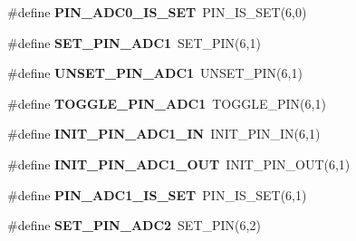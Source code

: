 \begin{DoxyCompactItemize}
\item 
\hypertarget{group__chaos__internal_ga36b481203cb07d9f3eaebc2716d992fb}{\#define {\bfseries P\-I\-N\-\_\-\-A\-D\-C0\-\_\-\-I\-S\-\_\-\-S\-E\-T}~P\-I\-N\-\_\-\-I\-S\-\_\-\-S\-E\-T(6,0)}\label{group__chaos__internal_ga36b481203cb07d9f3eaebc2716d992fb}

\item 
\hypertarget{group__chaos__internal_ga8fda716103a0ece8568194f7d2b8f1cf}{\#define {\bfseries S\-E\-T\-\_\-\-P\-I\-N\-\_\-\-A\-D\-C1}~S\-E\-T\-\_\-\-P\-I\-N(6,1)}\label{group__chaos__internal_ga8fda716103a0ece8568194f7d2b8f1cf}

\item 
\hypertarget{group__chaos__internal_gab163c7cb46720c474fb5062e4b1e7b1b}{\#define {\bfseries U\-N\-S\-E\-T\-\_\-\-P\-I\-N\-\_\-\-A\-D\-C1}~U\-N\-S\-E\-T\-\_\-\-P\-I\-N(6,1)}\label{group__chaos__internal_gab163c7cb46720c474fb5062e4b1e7b1b}

\item 
\hypertarget{group__chaos__internal_gadbc63ddea7b3b19198e7536c479081ef}{\#define {\bfseries T\-O\-G\-G\-L\-E\-\_\-\-P\-I\-N\-\_\-\-A\-D\-C1}~T\-O\-G\-G\-L\-E\-\_\-\-P\-I\-N(6,1)}\label{group__chaos__internal_gadbc63ddea7b3b19198e7536c479081ef}

\item 
\hypertarget{group__chaos__internal_ga570f30427c6e1291e77f76233749a1d1}{\#define {\bfseries I\-N\-I\-T\-\_\-\-P\-I\-N\-\_\-\-A\-D\-C1\-\_\-\-I\-N}~I\-N\-I\-T\-\_\-\-P\-I\-N\-\_\-\-I\-N(6,1)}\label{group__chaos__internal_ga570f30427c6e1291e77f76233749a1d1}

\item 
\hypertarget{group__chaos__internal_ga0182283cf6a731271dd097f99adcd6db}{\#define {\bfseries I\-N\-I\-T\-\_\-\-P\-I\-N\-\_\-\-A\-D\-C1\-\_\-\-O\-U\-T}~I\-N\-I\-T\-\_\-\-P\-I\-N\-\_\-\-O\-U\-T(6,1)}\label{group__chaos__internal_ga0182283cf6a731271dd097f99adcd6db}

\item 
\hypertarget{group__chaos__internal_ga6ced4ddf619e6802ce362de6c4f4bf37}{\#define {\bfseries P\-I\-N\-\_\-\-A\-D\-C1\-\_\-\-I\-S\-\_\-\-S\-E\-T}~P\-I\-N\-\_\-\-I\-S\-\_\-\-S\-E\-T(6,1)}\label{group__chaos__internal_ga6ced4ddf619e6802ce362de6c4f4bf37}

\item 
\hypertarget{group__chaos__internal_gabd42bab3312f286f0867c3d4f9436251}{\#define {\bfseries S\-E\-T\-\_\-\-P\-I\-N\-\_\-\-A\-D\-C2}~S\-E\-T\-\_\-\-P\-I\-N(6,2)}\label{group__chaos__internal_gabd42bab3312f286f0867c3d4f9436251}


\end{DoxyCompactItemize}
